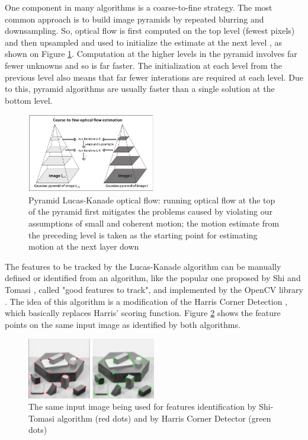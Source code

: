 \documentclass[msc, a4paper, classic, en]{ufbathesis}
\begin{document}
One component in many algorithms is a coarse-to-fine strategy. The most common approach is to build image pyramids by repeated blurring and downsampling. So, optical flow is first computed on the top level (fewest pixels) and then upsampled and used to initialize the estimate at the next level \cite{dblk}, as shown on Figure \ref{fig:plk}. Computation at the higher levels in the pyramid involves far fewer unknowns and so is far faster. The initialization at each level from the previous level also means that far fewer interations are required at each level. Due to this, pyramid algorithms are usually faster than a single solution at the bottom level.

\begin{figure}
\label{fig:plk}
\centering
\includegraphics[width=0.5\textwidth]{images/plk.png}
\caption{Pyramid Lucas-Kanade optical flow: running optical flow at the top of the pyramid first
mitigates the problems caused by violating our assumptions of small and coherent motion; the motion estimate from the preceding level is taken as the starting point for estimating motion at the next layer down \cite{bradski2008learning}}
\end{figure}

The features to be tracked by the Lucas-Kanade algorithm can be manually defined or identified from an algorithm, like the popular one proposed by Shi and Tomasi \cite{shi}, called "good features to track", and implemented by the OpenCV library \cite{opencv}. The idea of this algorithm is a modification of the Harris Corner Detection \cite{harris}, which basically replaces Harris' scoring function. Figure \ref{fig:shi-harris} shows the feature points on the same input image as identified by both algorithms.

\begin{figure}
\label{fig:shi-harris}
\centering
\includegraphics[width=0.5\textwidth]{images/shi-harris.png}
\caption{The same input image being used for features identification by Shi-Tomasi algorithm (red dots) and by Harris Corner Detector (green dots)}
\end{figure}
\end{document}
